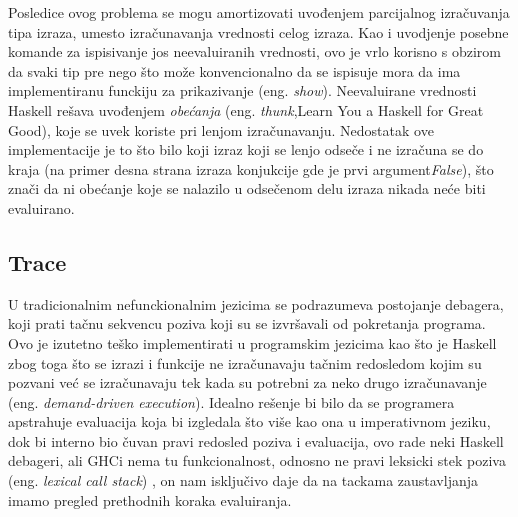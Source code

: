 \documentclass[a4paper]{article}
\begin{document}
{Posledice ovog problema se mogu amortizovati uvođenjem parcijalnog izračuvanja tipa izraza, umesto izračunavanja vrednosti celog izraza. Kao i uvodjenje posebne komande za ispisivanje jos neevaluiranih vrednosti, ovo je vrlo korisno s obzirom da svaki tip pre nego što može konvencionalno da se ispisuje mora da ima implementiranu funckiju za prikazivanje (eng. {\em show}). Neevaluirane vrednosti Haskell rešava uvođenjem {\em obećanja} (eng. {\em thunk},Learn You a Haskell for Great Good), koje se uvek koriste pri lenjom izračunavanju. Nedostatak ove implementacije je to što bilo koji izraz koji se lenjo odseče i ne izračuna se do kraja (na primer desna strana izraza konjukcije gde je prvi argument{\em False}), što znači da ni obećanje koje se nalazilo u odsečenom delu izraza nikada neće biti evaluirano. 


\subsection{Trace}

U tradicionalnim nefunckionalnim jezicima se podrazumeva postojanje debagera, koji prati tačnu sekvencu poziva koji su se izvršavali od pokretanja programa. Ovo je izutetno teško implementirati u programskim jezicima kao što je Haskell zbog toga što se izrazi i funkcije ne izračunavaju tačnim redosledom kojim su pozvani već se izračunavaju tek kada su potrebni za neko drugo izračunavanje (eng. {\em demand-driven execution}). Idealno rešenje bi bilo da se programera apstrahuje evaluacija koja bi izgledala što više kao ona u imperativnom jeziku, dok bi interno bio čuvan pravi redosled poziva i evaluacija, ovo rade neki Haskell debageri, ali GHCi nema tu funkcionalnost, odnosno ne pravi leksicki stek poziva (eng. {\em lexical call stack}) , on nam isključivo daje da na tackama zaustavljanja imamo pregled prethodnih koraka evaluiranja.


}
\end{document}
